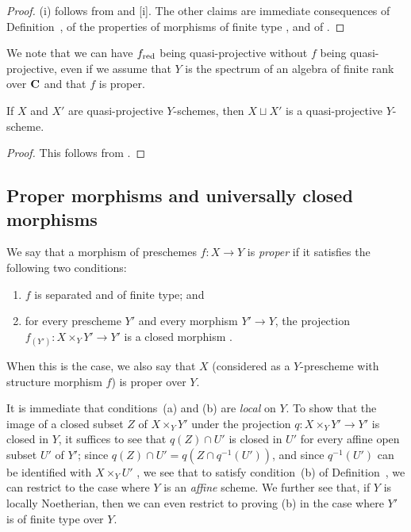 \begin{proof}
\label{proof-2.5.3.4}
(i) follows from  and [i].
The other claims are immediate consequences of Definition~, of the properties of morphisms of finite type , and of .
\end{proof}

\begin{rmk}[5.3.5]
\label{2.5.3.5}
We note that we can have $f_{\mathrm{red}}$ being quasi-projective without $f$ being quasi-projective, even if we assume that $Y$ is the spectrum of an algebra of finite rank over $\mathbf{C}$ and that $f$ is proper.
\end{rmk}

\begin{cor}[5.3.6]
\label{2.5.3.6}
If $X$ and $X'$ are quasi-projective $Y$-schemes, then $X\sqcup X'$ is a quasi-projective $Y$-scheme.
\end{cor}

\begin{proof}
\label{proof-2.5.3.6}
This follows from .
\end{proof}

\subsection{Proper morphisms and universally closed morphisms}
\label{subsection:proper-morphisms-and-universally-closed-morphisms}

\begin{defn}[5.4.1]
\label{2.5.4.1}
We say that a morphism of preschemes $f:X\to Y$ is \emph{proper} if it satisfies the following two conditions:
\begin{enumerate}[label=\emph{(\alph*)}]
  \item $f$ is separated and of finite type; and
  \item for every prescheme $Y'$ and every morphism $Y'\to Y$, the projection $f_{(Y')}:X\times_Y Y'\to Y'$ is a closed morphism .
\end{enumerate}

When this is the case, we also say that $X$ (considered as a $Y$-prescheme with structure morphism $f$) is proper over $Y$.
\end{defn}

It is immediate that conditions~(a) and (b) are \emph{local} on $Y$.
To show that the image of a closed subset $Z$ of $X\times_Y Y'$ under the projection $q:X\times_Y Y'\to Y'$ is closed in $Y$, it suffices to see that $q(Z)\cap U'$ is closed in $U'$ for every affine open subset $U'$ of $Y'$;
since $q(Z)\cap U'=q(Z\cap q^{-1}(U'))$, and since $q^{-1}(U')$ can be identified with $X\times_Y U'$ , we see that to satisfy condition~(b) of Definition~, we can restrict to the case where $Y$ is an \emph{affine} scheme.
We further see  that, if $Y$ is locally Noetherian, then we can even restrict to proving (b) in the case where $Y'$ is of finite type over $Y$.

